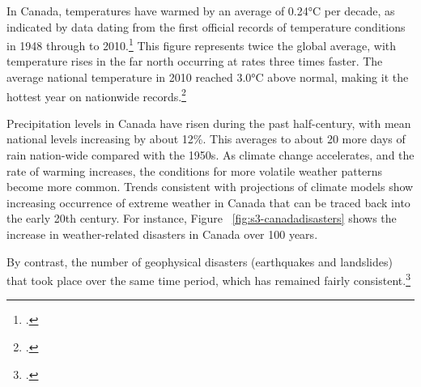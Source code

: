 


In Canada, temperatures have warmed by an average of 0.24°C per decade, as indicated by data dating from the first official records of temperature conditions in 1948 through to 2010.\footcite[][p. 13]{TellingWeatherStory}
This figure represents twice the global average, with temperature rises in the far north occurring at rates three times faster. 
The average national temperature in 2010 reached 3.0°C above normal, making it the hottest year on nationwide records.\footcite[][p. 13]{TellingWeatherStory}



Precipitation levels in Canada have risen during the past half-century, with mean national levels increasing by about 12\%. 
This averages to about 20 more days of rain nation-wide compared with the 1950s. 
As climate change accelerates, and the rate of warming increases, the conditions for more volatile weather patterns become more common. 
Trends consistent with projections of climate models show increasing occurrence of extreme weather in Canada that can be traced back into the early 20th century. 
For instance, Figure ~\ref{fig:s3-canadadisasters} shows the increase in weather-related disasters in Canada over 100 years.



By contrast, the number of geophysical disasters (earthquakes and landslides) that took place over the same time period, which has remained fairly consistent.\footcite[][p. 8]{ScanCCToronto}



